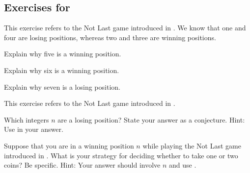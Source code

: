 
\subsection*{Exercises for  \subnotlast}

\begin{exer}[\exerP] %
\label{exer_not_last_winning_position}
    This exercise refers to the Not Last game introduced in .  We know that one and four are losing positions, whereas two and three are winning positions.
    \begin{exerpart}
            \item Explain why five is a winning position.
            \item Explain why six is a winning position.
            \item Explain why seven is a losing position.
    \end{exerpart}
\end{exer}

\begin{exer}[\exerU] %
\label{exer_not_last_conj} 
    This exercise refers to the Not Last game introduced in .  
        \begin{exerpart}
            \item Which integers $n$ are a losing position?  State your answer as a conjecture.  Hint: Use  in your answer. %
            \item Suppose that you are in a winning position $n$ while playing the Not Last game introduced in .  What is your strategy for deciding whether to take one or two coins? Be specific. Hint: Your answer should involve $n$ and use .
        \end{exerpart} 
\end{exer}


